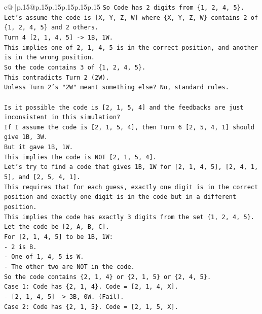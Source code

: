 \documentclass{article}
\begin{document}
{\begin{supertabular}{c@{$\;$}|p{.15\linewidth}@{}p{.15\linewidth}p{.15\linewidth}p{.15\linewidth}p{.15\linewidth}p{.15\linewidth}}
{{{\texttt{So Code has 2 digits from \{1, 2, 4, 5\}.} \\
\texttt{Let's assume the code is {[}X, Y, Z, W{]} where \{X, Y, Z, W\} contains 2 of \{1, 2, 4, 5\} and 2 others.} \\
\texttt{Turn 4 {[}2, 1, 4, 5{]} {-}> 1B, 1W.} \\
\texttt{This implies one of 2, 1, 4, 5 is in the correct position, and another is in the wrong position.} \\
\texttt{So the code contains 3 of \{1, 2, 4, 5\}.} \\
\texttt{This contradicts Turn 2 (2W).} \\
\texttt{Unless Turn 2's "2W" meant something else? No, standard rules.} \\
\\ 
\texttt{Is it possible the code is {[}2, 1, 5, 4{]} and the feedbacks are just inconsistent in this simulation?} \\
\texttt{If I assume the code is {[}2, 1, 5, 4{]}, then Turn 6 {[}2, 5, 4, 1{]} should give 1B, 3W.} \\
\texttt{But it gave 1B, 1W.} \\
\texttt{This implies the code is NOT {[}2, 1, 5, 4{]}.} \\
\texttt{Let's try to find a code that gives 1B, 1W for {[}2, 1, 4, 5{]}, {[}2, 4, 1, 5{]}, and {[}2, 5, 4, 1{]}.} \\
\texttt{This requires that for each guess, exactly one digit is in the correct position and exactly one digit is in the code but in a different position.} \\
\texttt{This implies the code has exactly 3 digits from the set \{1, 2, 4, 5\}.} \\
\texttt{Let the code be {[}2, A, B, C{]}.} \\
\texttt{For {[}2, 1, 4, 5{]} to be 1B, 1W:} \\
\texttt{{-} 2 is B.} \\
\texttt{{-} One of 1, 4, 5 is W.} \\
\texttt{{-} The other two are NOT in the code.} \\
\texttt{So the code contains \{2, 1, 4\} or \{2, 1, 5\} or \{2, 4, 5\}.} \\
\texttt{Case 1: Code has \{2, 1, 4\}. Code = {[}2, 1, 4, X{]}.} \\
\texttt{{-} {[}2, 1, 4, 5{]} {-}> 3B, 0W. (Fail).} \\
\texttt{Case 2: Code has \{2, 1, 5\}. Code = {[}2, 1, 5, X{]}.} \\
}}}
\end{supertabular}}
\end{document}
